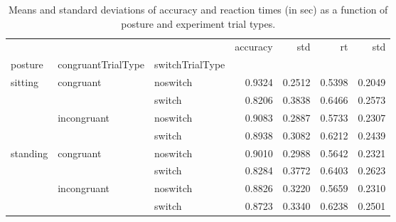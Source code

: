 \begin{table}
\centering
\caption{Means and standard deviations of accuracy and reaction times (in sec) as a function of posture and experiment trial types.}
\label{table-task-switching-replication-reaction-time}
\begin{tabular}{lllrrrr}
\toprule
         &             &        & accuracy &    std &     rt &    std \\
posture & congruantTrialType & switchTrialType &          &        &        &        \\
\midrule
sitting & congruant & noswitch &   0.9324 & 0.2512 & 0.5398 & 0.2049 \\
         &             & switch &   0.8206 & 0.3838 & 0.6466 & 0.2573 \\
         & incongruant & noswitch &   0.9083 & 0.2887 & 0.5733 & 0.2307 \\
         &             & switch &   0.8938 & 0.3082 & 0.6212 & 0.2439 \\
standing & congruant & noswitch &   0.9010 & 0.2988 & 0.5642 & 0.2321 \\
         &             & switch &   0.8284 & 0.3772 & 0.6403 & 0.2623 \\
         & incongruant & noswitch &   0.8826 & 0.3220 & 0.5659 & 0.2310 \\
         &             & switch &   0.8723 & 0.3340 & 0.6238 & 0.2501 \\
\bottomrule
\end{tabular}
\end{table}
